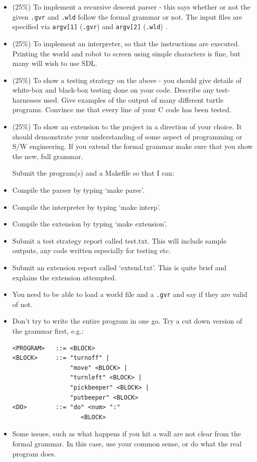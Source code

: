 \begin{exercise}
\begin{itemize}

\item (25\%) To implement a recursive descent parser - this says
whether or not the given \verb^.gvr^ and \verb^.wld^ follow the formal grammar or not.
The input files are specified via \verb^argv[1]^ (\verb^.gvr^) and \verb^argv[2]^ (\verb^.wld^) .

\item (25\%) To implement an interpreter, so that the instructions are
executed. Printing the world and robot to screen
using simple characters is fine, but many will wish to use SDL.

\item (25\%) To show a testing strategy on the above -
you should give details of
white-box and black-box testing done on your code. Describe any
test-harnesses used. Give examples of the output of many different
turtle programs. Convince me that every line of your C code
has been tested.

\item (25\%) To show an extension to the project in a direction of
your choice. It should demonstrate your understanding of some aspect
of programming or S/W engineering. If you extend the formal grammar
make sure that you show the new, full grammar.

Submit the program(s) and a Makefile so that I can:

\item Compile the parser by typing `make parse'.
\item Compile the interpreter by typing `make interp'.
\item Compile the extension by typing `make extension'.
\item Submit a test strategy report called test.txt. This will include
sample outputs, any code written especially for testing etc.
\item Submit an extension report called `extend.txt'. This is quite
brief and explains the extension attempted.

\item You need to be able to load a world file and a \verb^.gvr^
and say if they are valid of not.
\item Don't try to write the entire program in one go. Try a cut
down version of the grammar first, e.g.:
{\small
\begin{verbatim}
<PROGRAM>   ::= <BLOCK>
<BLOCK>     ::= "turnoff" |
                "move" <BLOCK> |
                "turnleft" <BLOCK> |
                "pickbeeper" <BLOCK> |
                "putbeeper" <BLOCK>
<DO>        ::= "do" <num> ":"
                   <BLOCK>
\end{verbatim}
}
\item Some issues, such as what happens if you hit a wall
are not clear from the formal grammar. In this case, use your
common sense, or do what the real program does.
\end{itemize}
\end{exercise}

